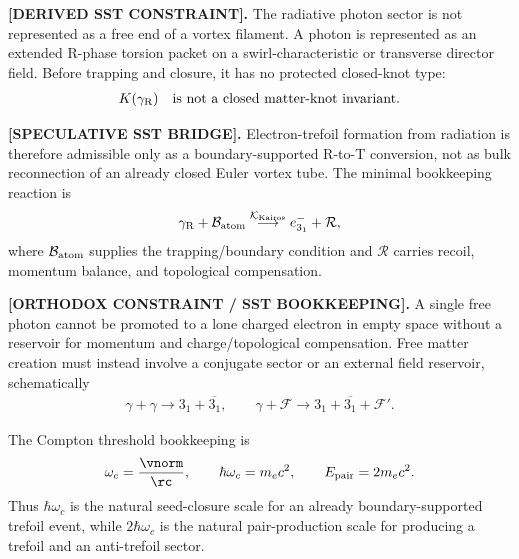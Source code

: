         \textbf{[DERIVED SST CONSTRAINT].}
        The radiative photon sector is not represented as a free end of a vortex
        filament. A photon is represented as an extended R-phase torsion packet
        on a swirl-characteristic or transverse director field. Before trapping
        and closure, it has no protected closed-knot type:
        \begin{align}
            K(\gamma_{\rm R})\quad\text{is not a closed matter-knot invariant.}
        \end{align}

        \textbf{[SPECULATIVE SST BRIDGE].}
        Electron-trefoil formation from radiation is therefore admissible only
        as a boundary-supported R-to-T conversion, not as bulk reconnection of
        an already closed Euler vortex tube. The minimal bookkeeping reaction is
        \begin{align}
            \gamma_{\rm R}
            +
            \mathcal{B}_{\rm atom}
            \overset{\mathcal{K}_{\rm Kairos}}{\longrightarrow}
            e^-_{3_1}
            +
            \mathcal{R},
            \label{eq:photon_r_to_t_kairos_closure}
        \end{align}
        where \(\mathcal{B}_{\rm atom}\) supplies the trapping/boundary
        condition and \(\mathcal{R}\) carries recoil, momentum balance, and
        topological compensation.

        \textbf{[ORTHODOX CONSTRAINT / SST BOOKKEEPING].}
        A single free photon cannot be promoted to a lone charged electron in
        empty space without a reservoir for momentum and charge/topological
        compensation. Free matter creation must instead involve a conjugate
        sector or an external field reservoir, schematically
        \begin{align}
            \gamma+\gamma
            \longrightarrow
            3_1+\overline{3_1},
            \qquad
            \gamma+\mathcal{F}
            \longrightarrow
            3_1+\overline{3_1}+\mathcal{F}' .
            \label{eq:pair_creation_topological_bookkeeping}
        \end{align}

        The Compton threshold bookkeeping is
        \begin{align}
            \omega_c = \frac{\vnorm}{\rc},
            \qquad
            \hbar\omega_c=m_e c^2,
            \qquad
            E_{\rm pair}=2m_e c^2 .
            \label{eq:compton_pair_threshold_bookkeeping}
        \end{align}
        Thus \(\hbar\omega_c\) is the natural seed-closure scale for an
        already boundary-supported trefoil event, while \(2\hbar\omega_c\) is
        the natural pair-production scale for producing a trefoil and an
        anti-trefoil sector.

